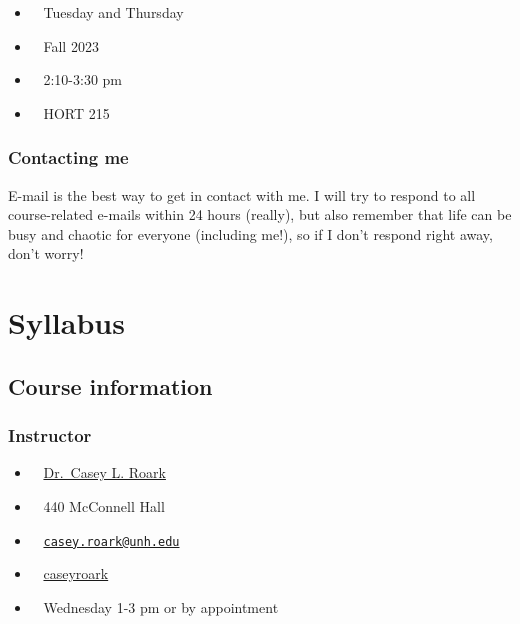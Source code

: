 \documentclass[
  letterpaper,
  DIV=11,
  numbers=noendperiod]{scrreprt}
\providecommand{\tightlist}{%
  \setlength{\itemsep}{0pt}\setlength{\parskip}{0pt}}\usepackage{longtable,booktabs,array}
\begin{document}
\begin{itemize}
\tightlist
\item
   ~ Tuesday and Thursday
\item
   ~ Fall 2023
\item
   ~ 2:10-3:30 pm
\item
   ~ HORT 215
\end{itemize}

\hypertarget{contacting-me}{%
\subsection*{Contacting me}\label{contacting-me}}

E-mail is the best way to get in contact with me. I will try to respond
to all course-related e-mails within 24 hours (really), but also
remember that life can be busy and chaotic for everyone (including me!),
so if I don't respond right away, don't worry!


\hypertarget{syllabus}{%
\chapter*{Syllabus}\label{syllabus}}


\hypertarget{course-information}{%
\section*{Course information}\label{course-information}}


\hypertarget{instructor-1}{%
\subsection*{Instructor}\label{instructor-1}}

\begin{itemize}
\tightlist
\item
   ~ \href{www.roarklab.com}{Dr.~Casey L. Roark}
\item
   ~ 440 McConnell Hall
\item
   ~
  \href{mailto:casey.roark@unh.edu}{\nolinkurl{casey.roark@unh.edu}}
\item
   ~
  \href{https://www.twitter.com/caseyroark}{caseyroark}
\item
   ~ Wednesday 1-3 pm or by appointment
\end{itemize}
\end{document}
